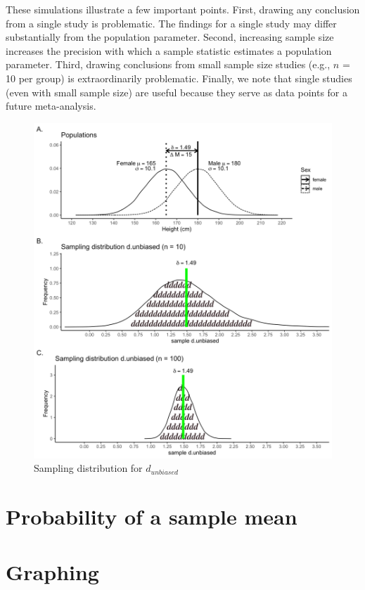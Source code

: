 \documentclass[
]{krantz}
\begin{document}
These simulations illustrate a few important points. First, drawing any conclusion from a single study is problematic. The findings for a single study may differ substantially from the population parameter. Second, increasing sample size increases the precision with which a sample statistic estimates a population parameter. Third, drawing conclusions from small sample size studies (e.g., \(n\) = 10 per group) is extraordinarily problematic. Finally, we note that single studies (even with small sample size) are useful because they serve as data points for a future meta-analysis.

\begin{figure}
\includegraphics[width=0.8\linewidth]{ch_samples_precision/images/d_distribs2} \caption{Sampling distribution for $d_{unbiased}$}\label{fig:ddistributions}
\end{figure}

\hypertarget{probability-of-a-sample-mean}{%
\chapter{Probability of a sample mean}\label{probability-of-a-sample-mean}}

\hypertarget{graphing}{%
\chapter{Graphing}\label{graphing}}
\end{document}
